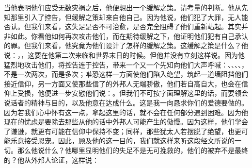 当他表明他们应受无数灾祸之后，他便想出一个缓解之策。请考量的判断。他从先知那里引入了控告，但缓解之策却来自他自己。因为他说，他们犯了大罪，无人能否认。但我们来看，这失足是否不可治愈，是否完全阻碍了他们重新站起。其实并非如此。你看他如何再次攻击他们，而在期待缓解之下，他证明他们犯有自己承认的罪。但我们来看，他究竟为他们设计了怎样的缓解之策。这缓解之策是什么？他说：，，这要在他第二次来临和世界末日的时候。但他并没有立刻这样说。因为他猛烈地攻击他们，将控告连于控告，带来一个又一个先知向他们大声呼喊：、、、、，不是一次两次，而是多次；唯恐这样一方面使他们陷入绝望，筑起一道墙阻挡他们接近信仰，另一方面又使那些信了的外邦人无端骄傲，他们若自高自大，也会在信仰上受损，他便进一步安慰他们说：。但我们不可按字面理解这里的话，而要领会说话者的精神与目的，以及他意在达成什么。这是我一向恳求你们的爱德要做的。因为若我们心中怀有这一点，拿起这里的话，就不会在任何部分遇到困难。因为他现在的忧虑是要除去那些从他的话中外邦人可能产生的傲慢。因为这样，他们学会了谦逊，就更有可能在信仰中保持不变；同样，那些犹太人若摆脱了绝望，也更可能乐意接受恩宠。因此，顾及他的这一目的，我们就这样来听这段经文所说的一切。那么他说什么？他哪里显明他们的失足不是无可挽救的，他们的被弃不是最终的？他从外邦人论证，这样说：\par

\par

